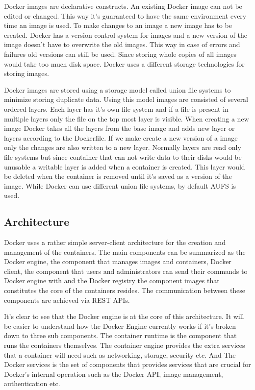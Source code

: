 \documentclass[12pt,oneandhalf,chaparabic,ceng,ms,eng,oneside,pntc]{gsufbe}
\begin{document}
Docker images are declarative constructs. An existing Docker image can not be edited or changed. This
way it's guaranteed to have the same environment every time an image is used. To make changes to an
image a new image has to be created. Docker has a version control system for images and a new version
of the image doesn't have to overwrite the old images. This way in case of errors and failures old
versions can still be used. Since storing whole copies of all images would take too much disk space.
Docker uses a different storage technologies for storing images.

Docker images are stored using a storage model called union file systems to minimize storing duplicate
data. Using this model images are consisted of several ordered layers. Each layer has it's own file
system and if a file is present in multiple layers only the file on the top most layer is visible. When
creating a new image Docker takes all the layers from the base image and adds new layer or layers
according to the Dockerfile. If we make create a new version of a image only the changes are also 
written to a new layer. Normally layers are read only file systems but since container that can not
write data to their disks would be unusable a writable layer is added when a container is created. This
layer would be deleted when the container is removed until it's saved as a version of the image.
While Docker can use different union file systems, by default AUFS is used.

\subsection{Architecture}
Docker uses a rather simple server-client architecture for the creation and management of the
containers. The main components can be summarized as the Docker engine, the component that manages
images and containers, Docker client, the component that users and administrators can send their
commands to Docker engine with and the Docker registry the component images that constitutes the core of
the containers resides. The communication between these components are achieved via REST APIs.

It's clear to see that the Docker engine is at the core of this architecture. It will be easier to
understand how the Docker Engine currently works if it's broken down to three sub components. The
container runtime is the component that runs the containers themselves. The container engine provides
the extra services that a container will need such as networking, storage, security etc. And The Docker 
services is the set of components that provides services that are crucial for Docker's internal
operation such as the Docker API, image management, authentication etc.
\end{document}
